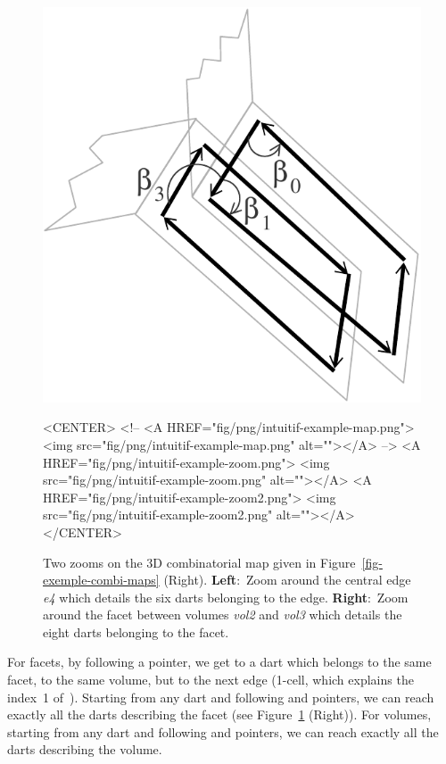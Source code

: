 \begin{figure}
\begin{ccTexOnly}
\begin{center}
      \includegraphics[width=\LargFig]{Combinatorial_map/fig/pdf/intuitif-example-zoom2}
    \end{center}
  \end{ccTexOnly}
  \begin{ccHtmlOnly}
    <CENTER>
    <!-- <A HREF="fig/png/intuitif-example-map.png">
    <img src="fig/png/intuitif-example-map.png" alt=""></A> -->
    <A HREF="fig/png/intuitif-example-zoom.png">
        <img src="fig/png/intuitif-example-zoom.png" alt=""></A>
    <A HREF="fig/png/intuitif-example-zoom2.png">
        <img src="fig/png/intuitif-example-zoom2.png" alt=""></A>
    </CENTER>
    \end{ccHtmlOnly}
    \caption{Two zooms on the 3D combinatorial map given in 
      Figure~\ref{fig-exemple-combi-maps} (Right).
      \textbf{Left}:~Zoom around the central edge \emph{e4} which details
      the six darts belonging to the edge.  \textbf{Right}:~Zoom
      around the facet between volumes \emph{vol2} and \emph{vol3} which
      details the eight darts belonging to the facet.}
    \label{fig-intuitive-exemple}
\end{figure}

For facets, by following a \betaun{} pointer, we get to a dart which
belongs to the same facet, to the same volume, but to the next edge
(1-cell, which explains the index~1 of~\betaun{}).  Starting from any
dart and following \betaun{} and \betatrois{} pointers, we can reach
exactly all the darts describing the facet (see
Figure~\ref{fig-intuitive-exemple} (Right)).
%
For volumes, starting from any dart and following \betaun{} and
\betadeux{} pointers, we can reach exactly all the darts describing the
volume.

